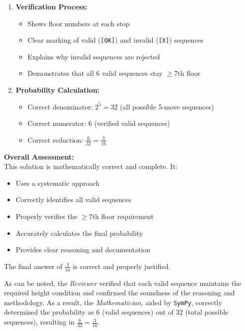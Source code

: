 \begin{thinking}
\begin{enumerate}[label=\arabic*.]
    \item \textbf{Verification Process:}
    \begin{itemize}[label={[\texttt{OK}]}]
        \item Shows floor numbers at each stop
        \item Clear marking of valid (\texttt{[OK]}) and invalid (\texttt{[X]}) sequences
        \item Explains why invalid sequences are rejected
        \item Demonstrates that all 6 valid sequences stay $\geq 7$th floor
    \end{itemize}
    
    \item \textbf{Probability Calculation:}
    \begin{itemize}[label={[\texttt{OK}]}]
        \item Correct denominator: $2^5 = 32$ (all possible 5-move sequences)
        \item Correct numerator: 6 (verified valid sequences)
        \item Correct reduction: $\frac{6}{32} = \frac{3}{16}$
    \end{itemize}
\end{enumerate}

\bigskip

\textbf{Overall Assessment:}\\[0.5em]
This solution is mathematically correct and complete. It:
\begin{itemize}
    \item Uses a systematic approach
    \item Correctly identifies all valid sequences
    \item Properly verifies the $\geq 7$th floor requirement
    \item Accurately calculates the final probability
    \item Provides clear reasoning and documentation
\end{itemize}

The final answer of $\frac{3}{16}$ is correct and properly justified.
\end{thinking}

As can be noted, the {\em Reviewer} verified that each valid sequence maintains the required height condition and confirmed the soundness of the reasoning and methodology. As a result, the {\em Mathematician}, aided by {\tt SymPy}, correctly determined the probability as 6 (valid sequences) out of 32 (total possible sequences), resulting in $\frac{6}{32} = \frac{3}{16}$.

